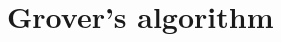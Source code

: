 \documentclass[11p,aspectratio=169]{beamer}
\begin{document}
    


            

   

    
    

\section{Grover's algorithm}
\end{document}
